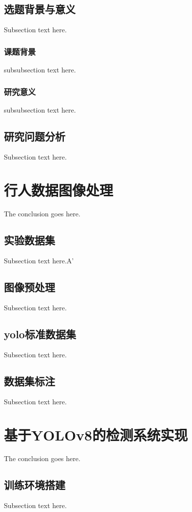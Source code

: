 \documentclass[journal]{IEEEtran}
\begin{document}
\subsection{选题背景与意义}
Subsection text here.
\subsubsection{课题背景}
subsubsection text here.
\subsubsection{研究意义}
subsubsection text here.

\subsection{研究问题分析}
Subsection text here.

\section{行人数据图像处理}
The conclusion goes here.

\subsection{实验数据集}
Subsection text here.A'
\subsection{图像预处理}
Subsection text here.
\subsection{yolo标准数据集}
Subsection text here.
\subsection{数据集标注}
Subsection text here.

\section{基于YOLOv8的检测系统实现}
The conclusion goes here.
\subsection{训练环境搭建}
Subsection text here.
\end{document}
